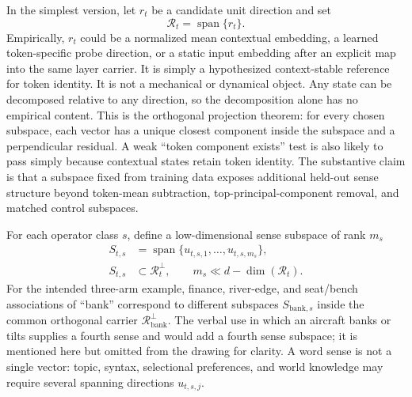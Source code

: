 \documentclass[
  aps,
  reprint,
  superscriptaddress,
  floatfix,
  nofootinbib,
  longbibliography
]{revtex4-2}
\DeclareMathOperator{\spanop}{span}
\begin{document}
In the simplest version, let $r_t$ be a candidate unit direction and set
%
\begin{equation}
\label{eq:reference-direction}
\mathcal R_t=\spanop\{r_t\}.
\end{equation}
%
Empirically, $r_t$ could be a normalized mean contextual embedding, a learned
token-specific probe direction, or a static input embedding after an explicit
map into the same layer carrier. It is simply a hypothesized context-stable reference for token
identity. It is not a mechanical or dynamical object.
Any state can be decomposed relative to any direction, so the decomposition
alone has no empirical content.  This is the orthogonal projection theorem:
for every chosen subspace, each vector has a unique closest component inside
the subspace and a perpendicular residual.  A weak ``token component exists''
test is also likely to pass simply because contextual states retain token
identity.  The substantive claim is that a subspace fixed from training data
exposes additional held-out sense structure beyond token-mean subtraction,
top-principal-component removal, and matched control subspaces.

For each operator class $s$, define a low-dimensional sense subspace of rank
$m_s$
%
\begin{equation}
\label{eq:sense-subspace}
\begin{aligned}
S_{t,s}&=\spanop\{u_{t,s,1},\dots,u_{t,s,m_s}\},\\
S_{t,s}&\subset\mathcal R_t^\perp,
\qquad m_s\ll d-\dim(\mathcal R_t) .
\end{aligned}
\end{equation}
%
For the intended three-arm example, finance, river-edge, and seat/bench
associations of ``bank'' correspond to different subspaces
$S_{\mathrm{bank},s}$ inside the common orthogonal carrier
$\mathcal R_{\mathrm{bank}}^\perp$.  The verbal use in which an aircraft
banks or tilts supplies a fourth sense and would add a fourth sense
subspace; it is mentioned here but omitted from the drawing for clarity.  A
word sense is not a single vector: topic, syntax, selectional preferences,
and world knowledge may require several spanning directions $u_{t,s,j}$.
\end{document}
